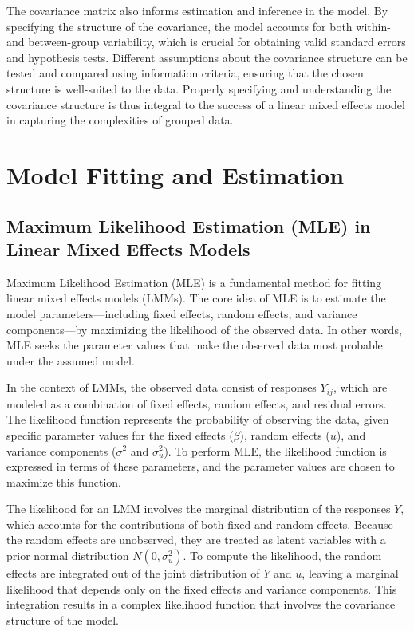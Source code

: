 The covariance matrix also informs estimation and inference in the model. By specifying the structure of the covariance, the model accounts for both within- and between-group variability, which is crucial for obtaining valid standard errors and hypothesis tests. Different assumptions about the covariance structure can be tested and compared using information criteria, ensuring that the chosen structure is well-suited to the data. Properly specifying and understanding the covariance structure is thus integral to the success of a linear mixed effects model in capturing the complexities of grouped data.

\section{Model Fitting and Estimation}
\subsection{Maximum Likelihood Estimation (MLE) in Linear Mixed Effects Models}
Maximum Likelihood Estimation (MLE) is a fundamental method for fitting linear mixed effects models (LMMs). The core idea of MLE is to estimate the model parameters—including fixed effects, random effects, and variance components—by maximizing the likelihood of the observed data. In other words, MLE seeks the parameter values that make the observed data most probable under the assumed model.

In the context of LMMs, the observed data consist of responses $Y_{ij}$, which are modeled as a combination of fixed effects, random effects, and residual errors. The likelihood function represents the probability of observing the data, given specific parameter values for the fixed effects ($\beta$), random effects ($u$), and variance components ($\sigma^2$ and $\sigma_u^2$). To perform MLE, the likelihood function is expressed in terms of these parameters, and the parameter values are chosen to maximize this function.

The likelihood for an LMM involves the marginal distribution of the responses $Y$, which accounts for the contributions of both fixed and random effects. Because the random effects are unobserved, they are treated as latent variables with a prior normal distribution $N(0,\sigma_u^2)$. To compute the likelihood, the random effects are integrated out of the joint distribution of $Y$ and $u$, leaving a marginal likelihood that depends only on the fixed effects and variance components. This integration results in a complex likelihood function that involves the covariance structure of the model.

